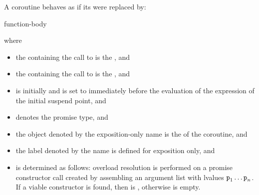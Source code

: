 \pnum
A coroutine behaves as if its  were replaced by:
\begin{ncsimplebnf}
\terminal{\{}\br
\bnfindent {}   \terminal{;}\br
\bnfindent {} \terminal{\{}\br
\bnfindent\bnfindent {}  \terminal{;}\br
\bnfindent\bnfindent function-body\br
\bnfindent {}\br
\bnfindent\bnfindent {}\br
\bnfindent\bnfindent\bnfindent {} \terminal{;}\br
\bnfindent\bnfindent {} \terminal{;}\br
\bnfindent \terminal{\}}\br
{} \terminal{:}\br
\bnfindent {}  \terminal{;}\br
\terminal{\}}
\end{ncsimplebnf}
where
\begin{itemize}
\item
the  containing
the call to 
is the , and
\item
the  containing
the call to 
is the , and
\item
{}
is initially  and is set to 
immediately before the evaluation
of the  expression
of the initial suspend point, and
\item
{} denotes the promise type, and
\item
the object denoted by the exposition-only name 
is the  of the coroutine, and
\item
the label denoted by the name 
is defined for exposition only, and
\item
{} is determined as follows:
overload resolution is performed on a promise constructor call created by
assembling an argument list with lvalues $\texttt{p}_1 \dotsc \texttt{p}_n$. If a viable
constructor is found, then
 is
, otherwise
 is empty.
\end{itemize}

